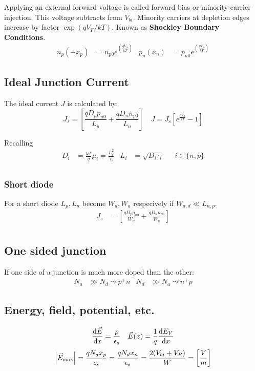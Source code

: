\documentclass[a4paper, fontsize=8pt, landscape, DIV=1]{scrartcl}
\begin{document}
\begin{multicols*}{4}
    Applying an external forward voltage is called forward bias or minority carrier injection.
    This voltage subtracts from $V_{bi}$.
    Minority carriers at depletion edges increase by factor $\exp(qV_F/kT)$.
    Known as \textbf{Shockley Boundary Conditions}.
    \begin{align*}
      n_p(-x_p) &= n_{p0}e^{\left(\frac{qV_a}{kT}\right)} & p_n(x_n) &= p_{n0}e^{\left(\frac{qV_a}{kT}\right)}
    \end{align*}
     

  \subsection{Ideal Junction Current}
    The ideal current $J$ is calculated by:
    \[ J_s = \left[ \frac{qD_pp_{n0}}{L_p} + \frac{qD_nn_{p0}}{L_n} \right] \quad J = J_s \left[ e^\frac{qV_a}{kT} -1 \right] \]
    
    Recalling
    \begin{align*}
      D_i &= \frac{kT}{q}\mu_i = \frac{L_i^2}{\tau_i} & L_i&=\sqrt{D_i\tau_i} & &i\in\{n,p\}\\
    \end{align*}

    \subsubsection{Short diode}
    For a short diode $L_p,L_n$ become $W_d, W_a$ respecively if $W_{a,d} \ll L_{n,p}$.
    \begin{align*}
      J_s &= \left[ \frac{qD_pp_{n0}}{W_d} + \frac{qD_nn_{p0}}{W_a} \right] \\
    \end{align*}


    \subsection{One sided junction}
    If one side of a junction is much more doped than the other:
    \begin{align*}
      N_a &\gg N_d \leadsto p^+n  & N_d &\gg N_a \leadsto n^+p 
    \end{align*}

    \subsection{Energy, field, potential, etc.}
    \[\frac{\mathrm{d}\vec{E}}{\mathrm{d}x}=\frac{\rho}{\epsilon_s} \quad \vec{E}(x) = \frac{1}{q}\frac{\mathrm{d}E_V}{\mathrm{d}x}\]
    \[ \left\vert\vec{E}_\text{max}\right\vert=\frac{qN_ax_p}{\epsilon_s}=\frac{qN_dx_n}{\epsilon_s}=\frac{2(V_{bi}+V_R)}{W} = \left[\frac{V}{m}\right]\]
    

\end{multicols*}
\end{document}
